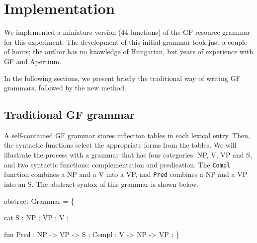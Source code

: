 \documentclass[10pt,a4paper]{article}
\newenvironment{Shaded}{\begin{snugshade}}{\end{snugshade}}
\newcommand{\DataTypeTok}[1]{\textcolor[rgb]{0.13,0.29,0.53}{{#1}}}
\newcommand{\OtherTok}[1]{\textcolor[rgb]{0.56,0.35,0.01}{{#1}}}
\newcommand{\FunctionTok}[1]{\textcolor[rgb]{0.00,0.00,0.00}{{#1}}}
\newcommand{\NormalTok}[1]{{#1}}
\begin{document}
\section{Implementation}

We implemented a miniature version (44 functions) of the GF resource
grammar \cite{ranta2009lilt} for this experiment. 
The development of this initial grammar took just a
couple of hours; the author has no knowledge of Hungarian, but years
of experience with GF and Apertium.

In the following sections, we present briefly the traditional way of writing GF
grammars, followed by the new method.

\subsection{Traditional GF grammar}

A self-contained GF grammar stores inflection tables in each lexical
entry. Then, the syntactic functions select the appropriate forms from
the tables. We will illustrate the process with a grammar that has
four categories: NP, V, VP and S, and two syntactic functions: complementation
and predication. The \texttt{Compl} function combines a NP and a V
into a VP, and \texttt{Pred} combines a NP and a VP into an S.
The abstract syntax of this grammar is shown below.
 
\vspace{-1mm}

\begin{Shaded}
\begin{Highlighting}[]
  \NormalTok{abstract }\DataTypeTok{Grammar} \FunctionTok{=} \NormalTok{\{}

  \NormalTok{cat }
    \DataTypeTok{S} \NormalTok{; }\DataTypeTok{NP} \NormalTok{; }\DataTypeTok{VP} \NormalTok{; }\DataTypeTok{V} \NormalTok{;}

  \NormalTok{fun}
    \DataTypeTok{Pred} \FunctionTok{:} \DataTypeTok{NP} \OtherTok{->} \DataTypeTok{VP} \OtherTok{->} \DataTypeTok{S} \NormalTok{;}
    \DataTypeTok{Compl} \FunctionTok{:} \DataTypeTok{V} \OtherTok{->} \DataTypeTok{NP} \OtherTok{->} \DataTypeTok{VP} \NormalTok{;}
  \NormalTok{\}}
\end{Highlighting}
\end{Shaded}

\end{document}
